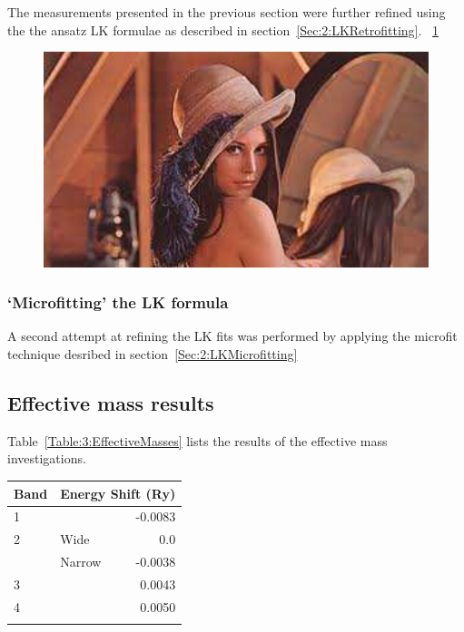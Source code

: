 The measurements presented in the previous section were further refined using the the ansatz LK formulae as described in section~\ref{Sec:2:LKRetrofitting}. \Fig~\ref{Fig:3:RetrofittedLKFits}
\begin{figure}[h!]
    \begin{center}
        \includegraphics[scale=0.7]{Misc/TODO}
        \caption{}
        \label{Fig:3:RetrofittedLKFits}
    \end{center}
\end{figure}

\subsubsection{`Microfitting' the LK formula}

A second attempt at refining the LK fits was performed by applying the microfit technique desribed in section~\ref{Sec:2:LKMicrofitting}

\subsection{Effective mass results}

Table~\ref{Table:3:EffectiveMasses} lists the results of the effective mass investigations.
\medskip
\begin{center}
    \begin{tabular}[h!]{llr}
\toprule
Band    & \multicolumn{2}{l}{Energy Shift (\unit{Ry})} \\
\midrule
1       &       & -0.0083      \\
2       & Wide  & 0.0          \\
        & Narrow & -0.0038     \\
3       &       & 0.0043       \\
4       &       & 0.0050        \\
\bottomrule
    \label{Table:3:EnergyShifts}
    \end{tabular}
\end{center}

